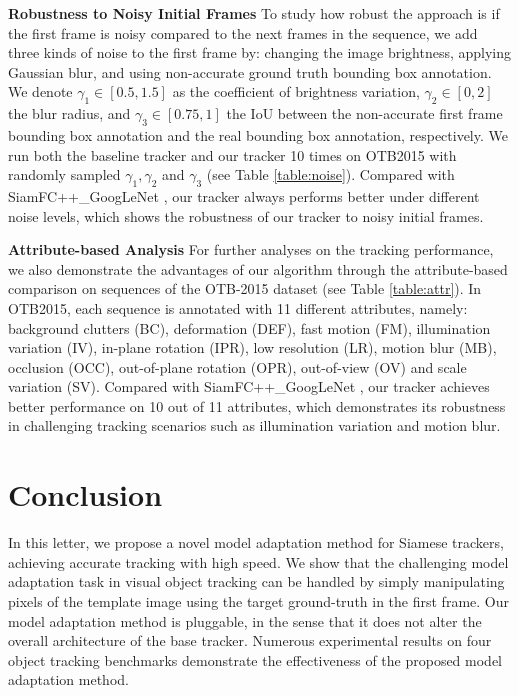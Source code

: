 \textbf{Robustness to Noisy Initial Frames} To study how robust the approach is if the first frame is noisy compared to the next frames in the sequence, we add three kinds of noise to the first frame by: changing the image brightness, applying Gaussian blur, and using non-accurate ground truth bounding box annotation. We denote $\gamma_1 \in [0.5, 1.5]$ as the coefficient of brightness variation, $\gamma_2 \in [0, 2]$ the blur radius, and $\gamma_3 \in [0.75, 1]$ the IoU between the non-accurate first frame bounding box annotation and the real bounding box annotation, respectively. We run both the baseline tracker and our tracker 10 times on OTB2015 with randomly sampled $\gamma_1, \gamma_2$ and $\gamma_3$ (see Table \ref{table:noise}). Compared with SiamFC++\_GoogLeNet \cite{SiamFC++}, our tracker always performs better under different noise levels, which shows the robustness of our tracker to noisy initial frames.%

\textbf{Attribute-based Analysis} For further analyses on the tracking performance, we also demonstrate the advantages of our algorithm through the attribute-based comparison on sequences of the OTB-2015 dataset (see Table \ref{table:attr}). In OTB2015, each sequence is annotated with 11 different attributes, namely: background clutters (BC), deformation (DEF), fast motion (FM), illumination variation (IV), in-plane rotation (IPR), low resolution (LR), motion blur (MB), occlusion (OCC), out-of-plane rotation (OPR), out-of-view (OV) and scale variation (SV). Compared with SiamFC++\_GoogLeNet \cite{SiamFC++}, our tracker achieves better performance on 10 out of 11 attributes, which demonstrates its robustness in challenging tracking scenarios such as illumination variation and motion blur.

\section{Conclusion}
In this letter, we propose a novel model adaptation method for Siamese trackers, achieving accurate tracking with high speed. We show that the challenging model adaptation task in visual object tracking can be handled by simply manipulating pixels of the template image using the target ground-truth in the first frame. Our model adaptation method is pluggable, in the sense that it does not alter the overall architecture of the base tracker. Numerous experimental results on four object tracking benchmarks demonstrate the effectiveness of the proposed model adaptation method.